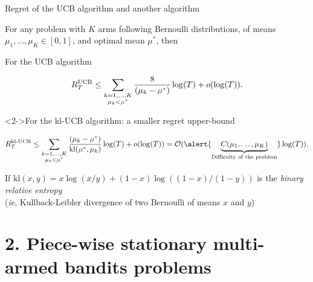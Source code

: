 \documentclass[11pt,english,ignorenonframetext,]{beamer}
\begin{document}
\begin{frame}{Regret of the UCB algorithm and another algorithm}

  For any problem with $K$ arms following Bernoulli distributions, of means $\mu_1,\dots,\mu_K \in[0,1]$, and \textcolor{deeppurple}{optimal mean $\mu^*$}, then

  \begin{exampleblock}{For the UCB algorithm}
    \begin{small}
      \[ R_T^{\mathrm{UCB}} \leq \sum_{\substack{k=1,\dots,K \\ \mu_k < \textcolor{deeppurple}{\mu^*}}} \frac{8}{(\mu_k - \textcolor{deeppurple}{\mu^*})} \log(T) + o(\log(T)). \]
    \end{small}%
  \end{exampleblock}

  \begin{exampleblock}<2->{For the kl-UCB algorithm: a smaller regret upper-bound}
    \begin{small}
      \[ R_T^{\mathrm{kl}\text{-}\mathrm{UCB}} \leq \sum_{\substack{k=1,\dots,K \\ \mu_k < \textcolor{deeppurple}{\mu^*}}} \frac{(\mu_k - \textcolor{deeppurple}{\mu^*})}{\mathrm{kl}(\textcolor{deeppurple}{\mu^*}, \mu_k)} \log(T) + o(\log(T)) = \mathcal{O}( \alert{\underbrace{C(\mu_1,\dots,\mu_K)}_{\text{Difficulty of the problem}}} \log(T) ). \]
    \end{small}%
    \begin{footnotesize}
      If $\mathrm{kl}(x, y) = x \log(x/y) + (1-x) \log((1-x)/(1-y))$ is the \emph{binary relative entropy}\\
      (\emph{ie}, Kullback-Leibler divergence of two Bernoulli of means $x$ and $y$)
    \end{footnotesize}%
  \end{exampleblock}

\end{frame}


\section{\hfill{}2. Piece-wise stationary multi-armed bandits problems\hfill{}}
\end{document}
